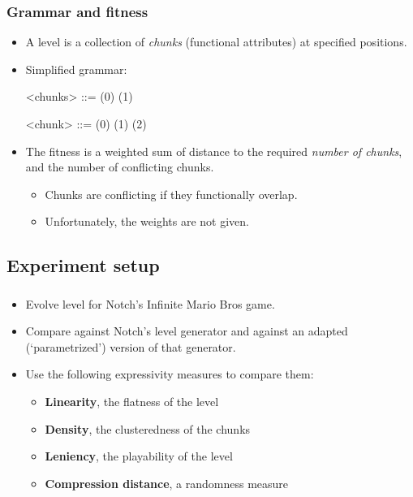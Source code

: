 \documentclass{beamer}
\makeatletter
\newcommand*{\currentname}{\@currentlabelname}
\makeatother
\begin{document}
\begin{frame}
\frametitle{Grammar and fitness}
\begin{itemize}
\item A level is a collection of \textit{chunks} (functional attributes) at specified positions.
\item Simplified grammar:
\vspace{1em}\begin{grammar}
<chunks> ::=  \hfill (0) \hspace{1em}
        \alt {}  \hfill (1) \hspace{1em}
        
<chunk>  ::= \lit*{,}\lit*{,}\lit*{)} \hfill (0) \hspace{1em}
        \alt {}\lit*{,}\lit*{,}\lit*{)} \hfill (1) \hspace{1em}
        \alt {}\lit*{,}\lit*{,}\lit*{)} \hfill (2) \hspace{1em}
        \alt [...]
\end{grammar}\vspace{1em}
\item The fitness is a weighted sum of distance to the required \textit{number of chunks}, and the number of conflicting chunks.
\begin{itemize}
\item Chunks are conflicting if they functionally overlap.
\item Unfortunately, the weights are not given.
\end{itemize}
\end{itemize}
\end{frame}

\subsection{Experiment setup}
\begin{frame}
\frametitle{\currentname}
\begin{itemize}
\item Evolve level for Notch's Infinite Mario Bros game.
\item Compare against Notch's level generator and against an adapted (`parametrized') version of that generator.
\item Use the following expressivity measures to compare them:
\begin{itemize}
\item \textbf{Linearity}, the flatness of the level
\item \textbf{Density}, the clusteredness of the chunks
\item \textbf{Leniency}, the playability of the level
\item \textbf{Compression distance}, a randomness measure
\end{itemize}
\end{itemize}
\end{frame}
\end{document}

